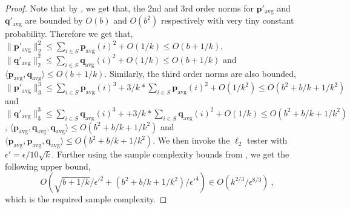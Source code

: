 \documentclass[10pt]{article} %
\theoremstyle{plain}
\newcommand{\bp}{\textbf{p}}
\newcommand{\bq}{\textbf{q}}
\newcommand{\avg}{\mathrm{avg}}
\begin{document}
\begin{proof}
    Note that by , we get that, the $2$nd and $3$rd order norms for $\bp'_{\avg}$ and $\bq'_{\avg}$ are bounded by $O(b)$ and $O(b^2)$ respectively with very tiny constant probability. Therefore we get that,
	$\|\bp'_{\avg}\|_2^2 \leq \sum_{i \in S}\bp_{\avg}(i)^2 + O(1/k) \leq O(b+1/k)$, $\|\bq'_{\avg}\|_2^2 \leq \sum_{i \in S}\bq_{\avg}(i)^2 + O(1/k) \leq O(b+1/k)$ and $\langle \bp_{\avg},\bq_{\avg} \rangle \leq O(b+1/k)$. Similarly, the third order norms are also bounded, $\|\bp'_{\avg}\|_3^3 \leq \sum_{i \in S}\bp_{\avg}(i)^3 + 3/k * \sum_{i \in S}\bp_{\avg}(i)^2  + O(1/k^2) \leq O(b^2+b/k+1/k^2)$ and $\|\bq'_{\avg}\|_3^3 \leq \sum_{i \in S}\bq_{\avg}(i)^3 + + 3/k * \sum_{i \in S}\bq_{\avg}(i)^2 + O(1/k) \leq O(b^2+b/k+1/k^2)$, $\langle \bp_{\avg},\bq_{\avg},\bq_{\avg} \rangle \leq O(b^2+b/k+1/k^2)$ and $\langle \bp_{\avg},\bp_{\avg},\bq_{\avg} \rangle \leq O(b^2+b/k+1/k^2)$.
	 We then invoke the $\ell_2$ tester with $\epsilon' = \epsilon/10 \sqrt{k}$. Further using the sample complexity bounds from , we get the following upper bound,
	$$O(\sqrt{b+1/k}/\epsilon'^2 + (b^2+b/k+1/k^2)/\epsilon'^4) \in O(k^{2/3}/\epsilon^{8/3})~,$$
	which is the required sample complexity.
\end{proof}
\end{document}
